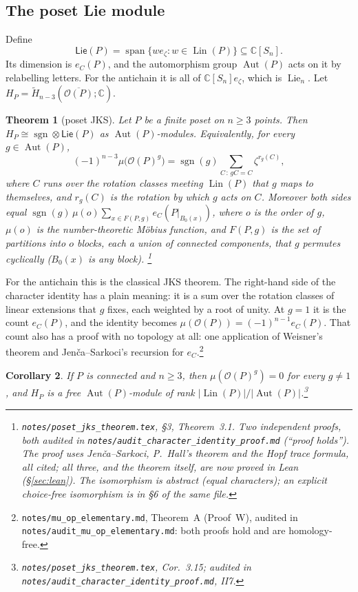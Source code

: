 \documentclass[11pt]{article}
\newtheorem{theorem}{Theorem}
\newtheorem{corollary}[theorem]{Corollary}
\theoremstyle{definition}
\theoremstyle{remark}
\newcommand{\OP}{\mathcal O}
\newcommand{\Lin}{\operatorname{Lin}}
\newcommand{\Aut}{\operatorname{Aut}}
\newcommand{\Lie}{\operatorname{Lie}}
\newcommand{\PLie}{\mathsf{Lie}}
\newcommand{\sgn}{\operatorname{sgn}}
\newcommand{\src}[1]{\nolinkurl{#1}}
\newcommand{\tagbox}[1]{\leavevmode\marginpar{\raggedright\fbox{\parbox{0.66in}{\centering\scriptsize\sffamily #1}}}}
\newcommand{\PROVEN}{\tagbox{PROVEN\\AUDITED}}
\begin{document}
\subsection{The poset Lie module}

Define
\[
\PLie(P)=\operatorname{span}\{we_\zeta: w\in\Lin(P)\}\subseteq\mathbb C[S_n].
\]
Its dimension is $e_C(P)$, and the automorphism group $\Aut(P)$ acts on it by
relabelling letters. For the antichain it is all of $\mathbb C[S_n]e_\zeta$,
which is $\Lie_n$. Let $H_P=\widetilde H_{n-3}(\overline{\OP(P)};\mathbb C)$.

\begin{theorem}[poset JKS]\label{thm:posetjks}\PROVEN
Let $P$ be a finite poset on $n\ge3$ points. Then
$H_P\cong\sgn\otimes\PLie(P)$ as $\Aut(P)$-modules. Equivalently, for every
$g\in\Aut(P)$,
\[
(-1)^{n-3}\mu\bigl(\OP(P)^g\bigr)=\sgn(g)\sum_{C\,:\,gC=C}\zeta^{r_g(C)},
\]
where $C$ runs over the rotation classes meeting $\Lin(P)$ that $g$ maps to
themselves, and $r_g(C)$ is the rotation by which $g$ acts on $C$. Moreover
both sides equal $\sgn(g)\,\mu(o)\sum_{x\in F(P,g)}e_C(P|_{B_0(x)})$, where $o$
is the order of $g$, $\mu(o)$ is the number-theoretic M\"obius function, and
$F(P,g)$ is the set of partitions into $o$ blocks, each a union of connected
components, that $g$ permutes cyclically ($B_0(x)$ is any block).%
\footnote{\src{notes/poset_jks_theorem.tex}, \S3, Theorem~3.1. Two
independent proofs, both audited in
\src{notes/audit_character_identity_proof.md} (``proof holds''). The proof
uses Jen\v{c}a--Sarkoci, P.~Hall's theorem and the Hopf trace formula, all
cited; all three, and the theorem itself, are now proved in Lean
(\S\ref{sec:lean}). The isomorphism is abstract (equal characters); an explicit
choice-free isomorphism is in \S6 of the same file.}
\end{theorem}

For the antichain this is the classical JKS theorem. The right-hand side
of the character identity has a plain meaning: it is a sum over the rotation
classes of linear extensions that $g$ fixes, each weighted by a root of unity.
At $g=1$ it is the count $e_C(P)$, and the identity becomes
$\mu(\OP(P))=(-1)^{n-1}e_C(P)$. That count also has a proof with no topology
at all: one application of Weisner's theorem and Jen\v{c}a--Sarkoci's
recursion for $e_C$.\footnote{\src{notes/mu_op_elementary.md}, Theorem~A
(Proof~W), audited in \src{notes/audit_mu_op_elementary.md}: both proofs
hold and are homology-free.}\PROVEN

\begin{corollary}\PROVEN
If $P$ is connected and $n\ge3$, then $\mu(\OP(P)^g)=0$ for every $g\ne1$, and
$H_P$ is a free $\Aut(P)$-module of rank $|\Lin(P)|/|\Aut(P)|$.\footnote{%
\src{notes/poset_jks_theorem.tex}, Cor.~3.15; audited in
\src{notes/audit_character_identity_proof.md}, II7.}
\end{corollary}
\end{document}

